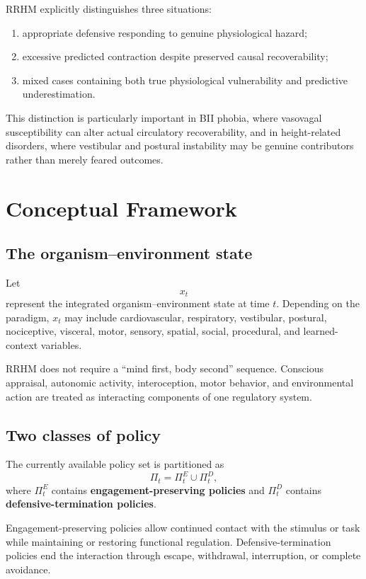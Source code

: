 \documentclass[11pt]{article}
\begin{document}
RRHM explicitly distinguishes three situations:
\begin{enumerate}[leftmargin=2em]
\item appropriate defensive responding to genuine physiological hazard;
\item excessive predicted contraction despite preserved causal recoverability;
\item mixed cases containing both true physiological vulnerability and predictive underestimation.
\end{enumerate}

This distinction is particularly important in BII phobia, where vasovagal susceptibility can alter actual circulatory recoverability, and in height-related disorders, where vestibular and postural instability may be genuine contributors rather than merely feared outcomes.

\section{Conceptual Framework}
\subsection{The organism--environment state}
Let
\[
x_t
\]
represent the integrated organism--environment state at time $t$. Depending on the paradigm, $x_t$ may include cardiovascular, respiratory, vestibular, postural, nociceptive, visceral, motor, sensory, spatial, social, procedural, and learned-context variables.

RRHM does not require a ``mind first, body second'' sequence. Conscious appraisal, autonomic activity, interoception, motor behavior, and environmental action are treated as interacting components of one regulatory system.

\subsection{Two classes of policy}
The currently available policy set is partitioned as
\[
\Pi_t=\Pi_t^{E}\cup\Pi_t^{D},
\]
where $\Pi_t^{E}$ contains \textbf{engagement-preserving policies} and $\Pi_t^{D}$ contains \textbf{defensive-termination policies}.

Engagement-preserving policies allow continued contact with the stimulus or task while maintaining or restoring functional regulation. Defensive-termination policies end the interaction through escape, withdrawal, interruption, or complete avoidance.
\end{document}

